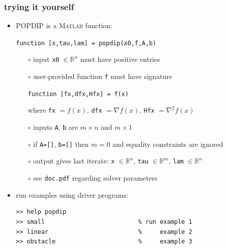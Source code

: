 \documentclass[10pt,hyperref,dvipsnames]{beamer}
\newcommand{\grad}{\nabla}
\newcommand{\RR}{\mathbb{R}}
\newcommand{\Matlab}{\textsc{Matlab}\xspace}
\begin{document}
\begin{frame}[fragile]
\frametitle{trying it yourself}

\begin{itemize}
\item POPDIP is a \Matlab function:

\medskip
\centerline{\texttt{function [x,tau,lam] = popdip(x0,f,A,b)}}

\medskip
    \begin{itemize}
    \item[$\circ$] input \texttt{x0} $\in\RR^n$ must have positive entries
    \item[$\circ$] user-provided function \texttt{f} must have signature

\medskip
\centerline{\texttt{function [fx,dfx,Hfx] = f(x)}}

\medskip
    where \texttt{fx} $=f(x)$, \texttt{dfx} $=\grad f(x)$, \texttt{Hfx} $= \grad^2 f(x)$
    \item[$\circ$] inputs \texttt{A}, \texttt{b} are $m\times n$ and $m\times 1$
    \item[$\circ$] if \texttt{A=[]}, \texttt{b=[]} then $m=0$ and equality constraints are ignored
    \item[$\circ$] output gives last iterate: \texttt{x} $\in\RR^n$, \texttt{tau} $\in\RR^m$, \texttt{lam} $\in\RR^n$
    \item[$\circ$] see \texttt{doc.pdf} regarding solver parameters
    \end{itemize}

\item run examples using driver programs:
\begin{Verbatim}[fontsize=\small]
>> help popdip
>> small                          % run example 1
>> linear                         %     example 2
>> obstacle                       %     example 3
\end{Verbatim}
\end{itemize}
\end{frame}
\end{document}
